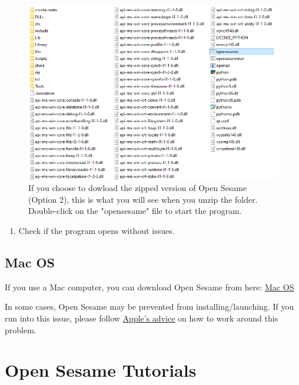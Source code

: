 \documentclass[
]{book}
\providecommand{\tightlist}{%
  \setlength{\itemsep}{0pt}\setlength{\parskip}{0pt}}
\begin{document}
\begin{figure}

{\centering \includegraphics[width=0.85\linewidth]{images/opensesame/Option2} 

}

\caption{If you choose to dowload the zipped version of Open Sesame (Option 2), this is what you will see when you unzip the folder. Double-click on the "opensesame" file to start the program.}\label{fig:Figure12-1}
\end{figure}

\begin{enumerate}
\def\labelenumi{\arabic{enumi}.}
\setcounter{enumi}{2}
\tightlist
\item
  Check if the program opens without issues.
\end{enumerate}

\hypertarget{mac-os}{%
\subsection{Mac OS}\label{mac-os}}

If you use a Mac computer, you can download Open Sesame from here:
\href{https://github.com/smathot/OpenSesame/releases/download/release\%2F3.2.8/opensesame_3.2.8-py2.7-macos-1.dmg}{Mac OS}

In some cases, Open Sesame may be prevented from installing/launching. If you run into this issue, please follow \href{https://support.apple.com/en-in/guide/mac-help/mh40616/mac}{Apple's advice} on how to work around this problem.

\hypertarget{open-sesame-tutorials}{%
\section{Open Sesame Tutorials}\label{open-sesame-tutorials}}
\end{document}
